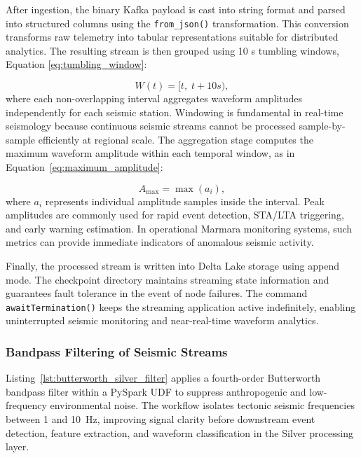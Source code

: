 \documentclass[data,article,accept,pdftex,moreauthors]{Definitions/mdpi}
\begin{document}
After ingestion, the binary Kafka payload is cast into string format and parsed into structured columns using the \texttt{from\_json()} transformation. This conversion transforms raw telemetry into tabular representations suitable for distributed analytics. The resulting stream is then grouped using 10 s tumbling windows, Equation \eqref{eq:tumbling_window}:

\begin{equation}
\label{eq:tumbling_window}
W(t)= [t,\; t+10s),
\end{equation}
where each non-overlapping interval aggregates waveform amplitudes independently for each seismic station. Windowing is fundamental in real-time seismology because continuous seismic streams cannot be processed sample-by-sample efficiently at regional scale. The aggregation stage computes the maximum waveform amplitude within each temporal window, as in Equation~\eqref{eq:maximum_amplitude}:

\begin{equation}
\label{eq:maximum_amplitude}
A_{\max} = \max(a_i),
\end{equation}
where $a_i$ represents individual amplitude samples inside the interval. Peak amplitudes are commonly used for rapid event detection, STA/LTA triggering, and early warning estimation. In operational Marmara monitoring systems, such metrics can provide immediate indicators of anomalous seismic activity.

Finally, the processed stream is written into Delta Lake storage using append mode. The checkpoint directory maintains streaming state information and guarantees fault tolerance in the event of node failures. The command \texttt{awaitTermination()} keeps the streaming application active indefinitely, enabling uninterrupted seismic monitoring and near-real-time waveform analytics.

\subsubsection{Bandpass Filtering of Seismic Streams}

Listing~\ref{lst:butterworth_silver_filter} applies a fourth-order Butterworth bandpass filter within a PySpark UDF to suppress anthropogenic and low-frequency environmental noise. The workflow isolates tectonic seismic frequencies between 1 and 10~Hz, improving signal clarity before downstream event detection, feature extraction, and waveform classification in the Silver \linebreak processing layer.
\end{document}
